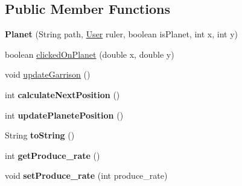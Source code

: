 \subsection*{Public Member Functions}
\begin{DoxyCompactItemize}
\item 
\mbox{\label{classfr_1_1groupe40_1_1projet_1_1model_1_1planets_1_1_planet_a25a432927475ec4e3d0812a4fc631239}} 
{\bfseries Planet} (String path, \mbox{\hyperlink{classfr_1_1groupe40_1_1projet_1_1client_1_1_user}{User}} ruler, boolean is\+Planet, int x, int y)
\item 
boolean \mbox{\hyperlink{classfr_1_1groupe40_1_1projet_1_1model_1_1planets_1_1_planet_a5636af2bdd54feb506204cbda5859f1f}{clicked\+On\+Planet}} (double x, double y)
\item 
void \mbox{\hyperlink{classfr_1_1groupe40_1_1projet_1_1model_1_1planets_1_1_planet_a6db5bb259c3c2889b0285b0472fc6a76}{update\+Garrison}} ()
\item 
\mbox{\label{classfr_1_1groupe40_1_1projet_1_1model_1_1planets_1_1_planet_a745df6537c22855fc854381c7ad2c029}} 
int {\bfseries calculate\+Next\+Position} ()
\item 
\mbox{\label{classfr_1_1groupe40_1_1projet_1_1model_1_1planets_1_1_planet_a55af7887127afab452dec09d5d149d90}} 
int {\bfseries update\+Planete\+Position} ()
\item 
\mbox{\label{classfr_1_1groupe40_1_1projet_1_1model_1_1planets_1_1_planet_af412d3420465e77b44fb404c1f2b2b09}} 
String {\bfseries to\+String} ()
\item 
\mbox{\label{classfr_1_1groupe40_1_1projet_1_1model_1_1planets_1_1_planet_aefe3771eb229fe25e8d09605057f6d00}} 
int {\bfseries get\+Produce\+\_\+rate} ()
\item 
\mbox{\label{classfr_1_1groupe40_1_1projet_1_1model_1_1planets_1_1_planet_ab725243f7aa413631c9dc428dee571de}} 
void {\bfseries set\+Produce\+\_\+rate} (int produce\+\_\+rate)

\end{DoxyCompactItemize}
